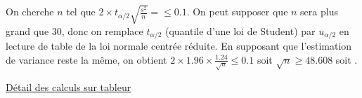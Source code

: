 {\begin{enumerate}
{On cherche $n$ tel que   $2\times t_{\alpha/2}\sqrt{\frac{s^2}{n}} = \leq 0.1$. On peut supposer que $n$ sera plus grand que $30$, donc on remplace $t_{\alpha/2}$ (quantile d'une loi de Student) par $u_{\alpha/2}$ en lecture de table de la loi normale centrée réduite.   En supposant que l'estimation de variance reste la même, on obtient $2\times 1.96 \times\frac{1.24}{\sqrt{n}} \leq 0.1$ soit $\sqrt{n} \geq 48.608$ soit . 

\href{https://stcyrterrenetdefensegouvf-my.sharepoint.com/:x:/g/personal/maxime_nguyen_st-cyr_terre-net_defense_gouv_fr/Ec9ve_iQd-pNn_Tf86GSa8EBJUrDEkRpISpMW4xkp23PeQ?e=oOly0h}{Détail des calculs sur tableur}

}
 \end{enumerate}}
